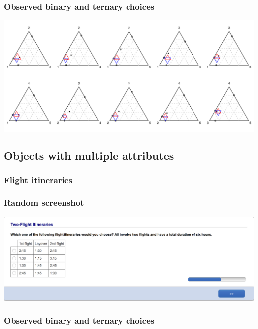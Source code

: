 \documentclass[11pt,letter]{article}
\begin{document}
\subsubsection*{Observed binary and ternary choices}

\includegraphics[width=15cm]{./Population_study_data/Simplexes/Hotel_rooms.pdf}

\pagebreak

\subsection*{Objects with multiple attributes}

\subsubsection{Flight itineraries}



\subsubsection*{Random screenshot}

\includegraphics[width=15cm]{Population_study_design/screenshot_Two-Flight_Itineraries.png}

\subsubsection*{Observed binary and ternary choices}
\end{document}
